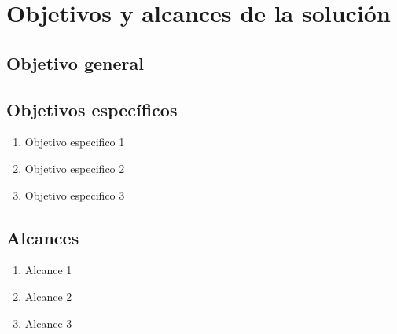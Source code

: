\section{Objetivos y alcances de la solución}
\label{sec:objetivos}

\subsection{Objetivo general}
\label{subsec:objetivo-general}

\subsection{Objetivos específicos}
\label{subsec:objetivo-especificos}

\begin{enumerate}
	\item Objetivo especifico 1
	\item Objetivo especifico 2
	\item Objetivo especifico 3
\end{enumerate}

\subsection{Alcances}
\label{subsec:alcances}

\begin{enumerate}
	\item Alcance 1
	\item Alcance 2
	\item Alcance 3
\end{enumerate}